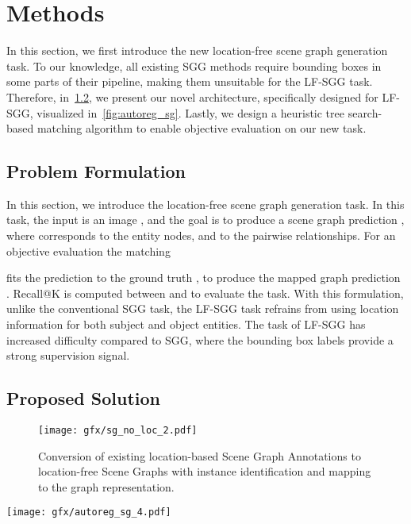 \documentclass[10pt,twocolumn,letterpaper]{article}
\begin{document}
 \section{Methods} 

In this section, we first introduce the new location-free scene graph generation task. To our knowledge, all existing SGG methods require bounding boxes in some parts of their pipeline, making them unsuitable for the LF-SGG task. Therefore, in~\cref{sec:prop_solution}, we present our novel architecture, specifically designed for LF-SGG, visualized in~\cref{fig:autoreg_sg}. Lastly, we design a heuristic tree search-based matching algorithm to enable objective evaluation on our new task.

\subsection{Problem Formulation}
\noindent
In this section, we introduce the location-free scene graph generation task. In this task, the input is an image , and the goal is to produce a scene graph prediction , where  corresponds to the entity nodes, and  to the pairwise relationships. For an objective evaluation the matching

 fits the prediction  to the ground truth , to produce the mapped graph prediction .
Recall@K  is computed between  and  to evaluate the task. With this formulation, unlike the conventional SGG task, the LF-SGG task refrains from using location information for both subject and object entities. The task of LF-SGG has increased difficulty compared to SGG, where the bounding box labels provide a strong supervision signal.

\subsection{Proposed Solution}
\label{sec:prop_solution}

\begin{figure}[t]
  \centering
  
   \texttt{[image: gfx/sg\_no\_loc\_2.pdf]}

   \caption{Conversion of existing location-based Scene Graph Annotations to location-free Scene Graphs with instance identification and mapping to the graph representation.}
   \label{fig:sg_no_loc}
\end{figure}

\begin{figure*}[t]
  \centering
  
   \texttt{[image: gfx/autoreg\_sg\_4.pdf]}

   \caption{Pix2SG Architecture: An image encoder encodes the image as a feature map that is flattened and used as the input sequence to the Autoregressive Transformer module. The Autoregressive Transformer predicts the components of the scene graph, token by token, considering all its previous predictions until the output SG-sequence is completed.}
   \label{fig:autoreg_sg}
\end{figure*}
\end{document}
